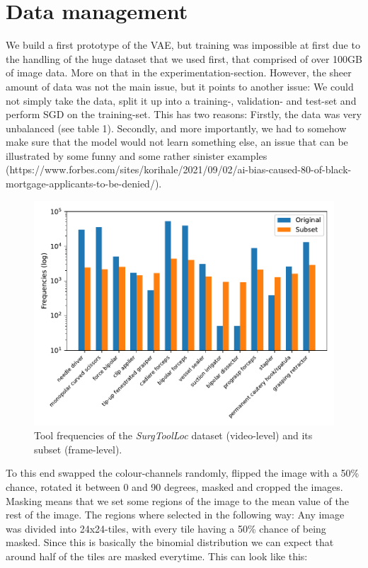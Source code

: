 \section{Data management}

We build a first prototype of the VAE, but training was impossible at first due to the handling of the huge dataset that we used first, that comprised of over 100GB of image data. More on that in the experimentation-section. However, the sheer amount of data was not the main issue, but it points to another issue: We could not simply take the data, split it up into a training-, validation- and test-set and perform SGD on the training-set. 
This has two reasons: Firstly, the data was very unbalanced (see table 1). Secondly, and more importantly, we had to somehow make sure that the model would not learn something else, an issue that can be illustrated by some funny and some rather sinister examples (https://www.forbes.com/sites/korihale/2021/09/02/ai-bias-caused-80-of-black-mortgage-applicants-to-be-denied/).

\begin{figure}[h]
	\centering
	\includegraphics[width=15cm]{4_experiments/images/surgtoolloc_frequencies.pdf}
	\caption{Tool frequencies of the \emph{SurgToolLoc} dataset (video-level) and its subset (frame-level).}
	\label{fig:surgtoolloc_tool_frequencies}
\end{figure}


To this end swapped the colour-channels randomly, flipped the image with a 50\% chance, rotated it between 0 and 90 degrees, masked and cropped the images. Masking means that we set some regions of the image to the mean value of the rest of the image. The regions where selected in the following way: Any image was divided into 24x24-tiles, with every tile having a 50\% chance of being masked. Since this is basically the binomial distribution we can expect that around half of the tiles are masked everytime. This can look like this:

